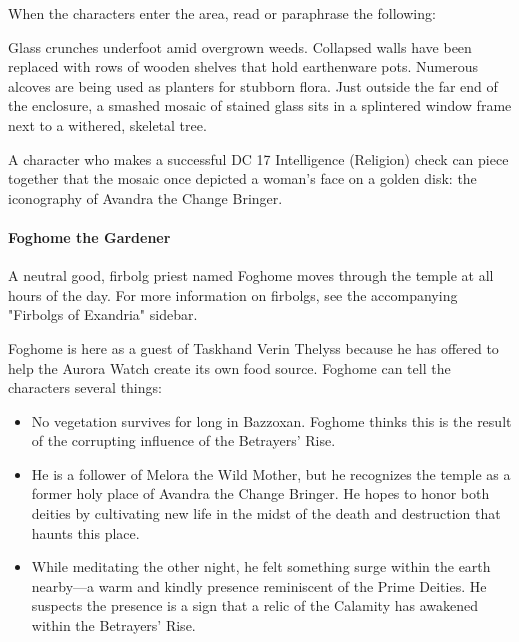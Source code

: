 \documentclass[10pt,a4paper,twoside,bg=print,twocolumn,openany,nodeprecatedcode]{dndbook}
\begin{document}
When the characters enter the area, read or paraphrase the following:

\begin{DndReadAloud}{}
Glass crunches underfoot amid overgrown weeds. Collapsed walls have been replaced with rows of wooden shelves that hold earthenware pots. Numerous alcoves are being used as planters for stubborn flora. Just outside the far end of the enclosure, a smashed mosaic of stained glass sits in a splintered window frame next to a withered, skeletal tree.

\end{DndReadAloud}

A character who makes a successful DC 17 Intelligence (Religion) check can piece together that the mosaic once depicted a woman's face on a golden disk: the iconography of Avandra the Change Bringer.

\paragraph{Foghome the Gardener}
A neutral good, firbolg priest named Foghome moves through the temple at all hours of the day. For more information on firbolgs, see the accompanying "Firbolgs of Exandria" sidebar.


Foghome is here as a guest of Taskhand Verin Thelyss because he has offered to help the Aurora Watch create its own food source. Foghome can tell the characters several things:


\begin{itemize}
\item No vegetation survives for long in Bazzoxan. Foghome thinks this is the result of the corrupting influence of the Betrayers' Rise.
\item He is a follower of Melora the Wild Mother, but he recognizes the temple as a former holy place of Avandra the Change Bringer. He hopes to honor both deities by cultivating new life in the midst of the death and destruction that haunts this place.
\item While meditating the other night, he felt something surge within the earth nearby—a warm and kindly presence reminiscent of the Prime Deities. He suspects the presence is a sign that a relic of the Calamity has awakened within the Betrayers' Rise.
\end{itemize}
\end{document}
